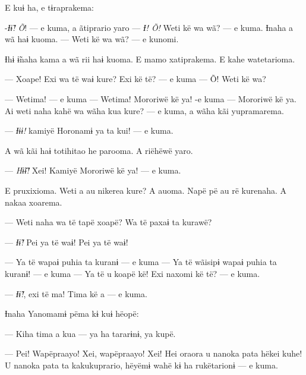 
E kuɨ ha, e tɨraprakema: 

-\textit{Ɨɨ̃! Õ}! --- e kuma, a ãtiprario yaro --- \textit{Ɨ! Õ!} Weti kë wa wã? --- e
kuma. Ɨnaha a wã haɨ kuoma. --- Weti kë wa wã? --- e kunomi. 

Ɨhɨ ɨ̃naha kama a wã rii haɨ kuoma. E mamo xatiprakema. E kahe
watetarioma. 

--- Xoape! Exi wa të waɨ kure? Exi kë të? --- e kuma --- Õ! Weti kë wa?

--- Wetima! --- e kuma --- Wetima! Mororiwë kë ya! -e kuma --- Mororiwë kë
ya. Ai weti naha kahë wa wãha kua kure? --- e kuma, a wãha kãi
yupramarema. 

--- \textit{Ɨɨɨ!} kamiyë Horonamɨ ya ta kui! --- e kuma. 

A wã kãi haɨ totihitao he parooma. A riëhëwë yaro. 

--- \textit{Hɨ̃ɨ̃!} Xei! Kamiyë Mororiwë kë ya! --- e kuma. 

E pruxixioma. Weti a au nikerea kure? A auoma. Napë pë au rë kurenaha. A nakaa xoarema. 

--- Weti naha wa të tapë xoapë? Wa të paxaɨ ta kurawë? 

--- \textit{Ɨɨ̃!} Pei ya të waɨ! Pei ya të waɨ! 

--- Ya të wapaɨ puhia ta kuranɨ --- e kuma --- Ya të wãisipɨ wapaɨ puhia ta
kuranɨ! --- e kuma --- Ya të u koapë kë! Exi naxomi kë të? --- e kuma. 

--- \textit{Ɨɨ̃!}, exi të ma! Tima kë a --- e kuma. 

Ɨnaha Yanomamɨ pëma kɨ kuɨ hëopë: 

--- Kiha tima a kua --- ya ha tararɨnɨ, ya kupë. 


--- Pei! Wapëpraayo! Xei, wapëpraayo! Xei! Hei oraora u nanoka pata hëkei
kuhe! U nanoka pata ta kakukuprario, hëyëmɨ wahë kɨ ha rukëtarionɨ --- e
kuma. 



